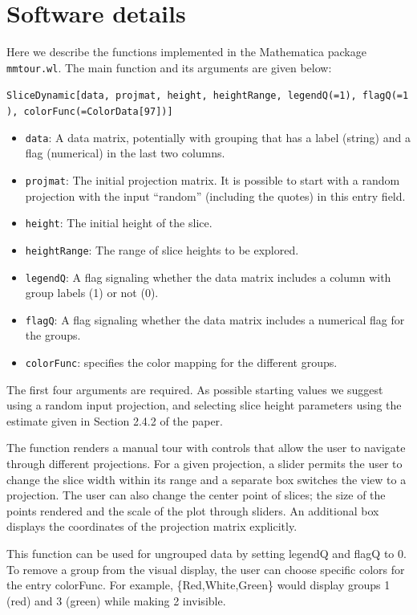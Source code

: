 \documentclass[]{interact}
\theoremstyle{plain}%
\theoremstyle{definition}
\theoremstyle{remark}
\def\tightlist{}
\begin{document}
\hypertarget{software-details}{%
\section{Software details}\label{software-details}}

Here we describe the functions implemented in the Mathematica package
\texttt{mmtour.wl}. The main function and its arguments are given below:

\texttt{SliceDynamic{[}data,\ projmat,\ height,\ heightRange,\ legendQ(=1),\ flagQ(=1),\ colorFunc(=ColorData{[}97{]}){]}}

\begin{itemize}
\tightlist
\item
  \texttt{data}: A data matrix, potentially with grouping that has a
  label (string) and a flag (numerical) in the last two columns.
\item
  \texttt{projmat}: The initial projection matrix. It is possible to
  start with a random projection with the input ``random'' (including
  the quotes) in this entry field.
\item
  \texttt{height}: The initial height of the slice.
\item
  \texttt{heightRange}: The range of slice heights to be explored.
\item
  \texttt{legendQ}: A flag signaling whether the data matrix includes a
  column with group labels (1) or not (0).
\item
  \texttt{flagQ}: A flag signaling whether the data matrix includes a
  numerical flag for the groups.
\item
  \texttt{colorFunc}: specifies the color mapping for the different
  groups.
\end{itemize}

The first four arguments are required. As possible starting values we
suggest using a random input projection, and selecting slice height
parameters using the estimate given in Section 2.4.2 of the paper.

The function renders a manual tour with controls that allow the user to
navigate through different projections. For a given projection, a slider
permits the user to change the slice width within its range and a
separate box switches the view to a projection. The user can also change
the center point of slices; the size of the points rendered and the
scale of the plot through sliders. An additional box displays the
coordinates of the projection matrix explicitly.

This function can be used for ungrouped data by setting legendQ and
flagQ to 0. To remove a group from the visual display, the user can
choose specific colors for the entry colorFunc. For example,
\{Red,White,Green\} would display groups 1 (red) and 3 (green) while
making 2 invisible.
\end{document}
